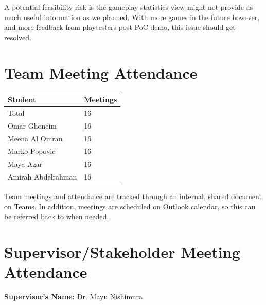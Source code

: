 \documentclass{article}
\begin{document}
A potential feasibility risk is the gameplay statistics view might not provide as much useful information as we planned. With more games in the future however, and more feedback from playtesters post PoC demo, this issue should get resolved.

\section{Team Meeting Attendance}


\begin{table}[H]
\centering
\begin{tabular}{ll}
\toprule
\textbf{Student} & \textbf{Meetings}\\
\midrule
Total & 16\\
Omar Ghoneim & 16\\
Meena Al Omran & 16\\
Marko Popovic & 16\\
Maya Azar & 16\\
Amirah Abdelrahman & 16\\
\bottomrule
\end{tabular}
\end{table}

Team meetings and attendance are tracked through an internal, shared document on Teams. In addition, meetings are scheduled on Outlook calendar, so this can be referred back to when needed.

\section{Supervisor/Stakeholder Meeting Attendance}


\noindent \textbf{Supervisor's Name: } Dr. Mayu Nishimura
\end{document}
